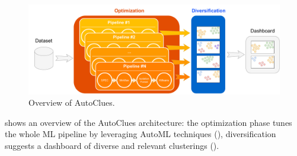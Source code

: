 
\begin{figure}[t]
    \centering
    \includegraphics[scale=.26]{chapters/data-centric/unsupervised/img/approach.pdf}
    \caption{Overview of AutoClues.}
    \label{clustering-fig:overview}
\end{figure}

%
 shows an overview of the AutoClues architecture:  the optimization phase tunes the whole ML pipeline by leveraging AutoML techniques (), diversification suggests a dashboard of diverse and relevant clusterings ().


